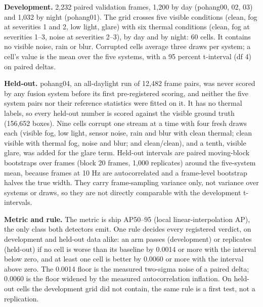\documentclass[journal]{IEEEtran}
\begin{document}
\textbf{Development.} 2,232 paired validation frames, 1,200 by day (pohang00, 02, 03) and 1,032 by night (pohang01). The grid crosses five visible conditions (clean, fog at severities 1 and 2, low light, glare) with six thermal conditions (clean, fog at severities 1--3, noise at severities 2--3), by day and by night: 60 cells. It contains no visible noise, rain or blur. Corrupted cells average three draws per system; a cell's value is the mean over the five systems, with a 95 percent t-interval (df 4) on paired deltas.

\textbf{Held-out.} pohang04, an all-daylight run of 12,482 frame pairs, was never scored by any fusion system before its first pre-registered scoring, and neither the five system pairs nor their reference statistics were fitted on it. It has no thermal labels, so every held-out number is scored against the visible ground truth (156,652 boxes). Nine cells corrupt one stream at a time with four fresh draws each (visible fog, low light, sensor noise, rain and blur with clean thermal; clean visible with thermal fog, noise and blur; and clean/clean), and a tenth, visible glare, was added for the glare term. Held-out intervals are paired moving-block bootstraps over frames (block 20 frames, 1,000 replicates) around the five-system mean, because frames at 10 Hz are autocorrelated and a frame-level bootstrap halves the true width. They carry frame-sampling variance only, not variance over systems or draws, so they are not directly comparable with the development t-intervals.

\textbf{Metric and rule.} The metric is ship AP50--95 (local linear-interpolation AP), the only class both detectors emit. One rule decides every registered verdict, on development and held-out data alike: an arm passes (development) or replicates (held-out) if no cell is worse than its baseline by 0.0014 or more with the interval below zero, and at least one cell is better by 0.0060 or more with the interval above zero. The 0.0014 floor is the measured two-sigma noise of a paired delta; 0.0060 is the floor widened by the measured autocorrelation inflation. On held-out cells the development grid did not contain, the same rule is a first test, not a replication.
\end{document}
